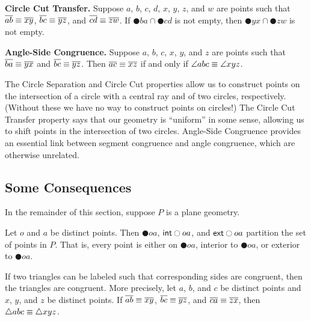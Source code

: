 \begin{dfn}
\begin{proplist}
\item \textbf{Circle Cut Transfer.} Suppose $a$, $b$, $c$, $d$, $x$, $y$, $z$, and $w$ are points such that $\overline{ab} \equiv \overline{xy}$, $\overline{bc} \equiv \overline{yz}$, and $\overline{cd} \equiv \overline{zw}$. If $\CIRCLE{b}{a} \cap \CIRCLE{c}{d}$ is not empty, then $\CIRCLE{y}{x} \cap \CIRCLE{z}{w}$ is not empty.

\item \textbf{Angle-Side Congruence.} Suppose $a$, $b$, $c$, $x$, $y$, and $z$ are points such that $\overline{ba} \equiv \overline{yx}$ and $\overline{bc} \equiv \overline{yz}$. Then $\overline{ac} \equiv \overline{xz}$ if and only if $\angle{abc} \equiv \angle{xyz}$.
\end{proplist}
\end{dfn}

The Circle Separation and Circle Cut properties allow us to construct points on the intersection of a circle with a central ray and of two circles, respectively. (Without these we have no way to construct points on circles!) The Circle Cut Transfer property says that our geometry is ``uniform'' in some sense, allowing us to shift points in the intersection of two circles. Angle-Side Congruence provides an essential link between segment congruence and angle congruence, which are otherwise unrelated.

\subsection*{Some Consequences}

In the remainder of this section, suppose \(P\) is a plane geometry.

\begin{prop}
Let $o$ and $a$ be distinct points. Then $\CIRCLE{o}{a}$, $\mathsf{int}\ocircle{oa}$, and $\mathsf{ext}\ocircle{oa}$ partition the set of points in \(P\). That is, every point is either on $\CIRCLE{o}{a}$, interior to $\CIRCLE{o}{a}$, or exterior to $\CIRCLE{o}{a}$.
\end{prop}

\begin{prop}
If two triangles can be labeled such that corresponding sides are congruent, then the triangles are congruent. More precisely, let $a$, $b$, and $c$ be distinct points and $x$, $y$, and $z$ be distinct points. If $\overline{ab} \equiv \overline{xy}$, $\overline{bc} \equiv \overline{yz}$, and $\overline{ca} \equiv \overline{zx}$, then $\bigtriangleup{abc} \equiv \bigtriangleup{xyz}$.
\end{prop}

